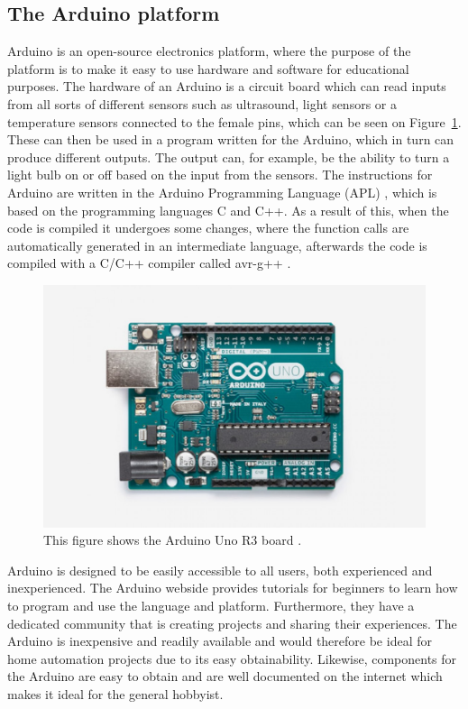 \subsection{The Arduino platform}
Arduino is an open-source electronics platform, where the purpose of the platform is to make it easy to use hardware and software for educational purposes. 
The hardware of an Arduino is a circuit board which can read inputs from all sorts of different sensors such as ultrasound, light sensors or a temperature sensors connected to the female pins, which can be seen on Figure~\ref{fig:ArduinoUnoR3}. 
These can then be used in a program written for the Arduino, which in turn can produce different outputs. The output can, for example, be the ability to turn a light bulb on or off based on the input from the sensors. The instructions for Arduino are written in the Arduino Programming Language (APL) \cite{ArduinoLanguage}, which is based on the programming  languages C and C++. As a result of this, when the code is compiled it undergoes some changes, where the function calls are automatically generated in an intermediate language, afterwards the code is compiled with a C/C++ compiler called avr-g++ \cite{ArduinoLanguage}.
\begin{figure}[H]
\centering
  \includegraphics[width=\textwidth]{figures/Analysis/ArduinoUnoR3.jpg}
  \caption{This figure shows the Arduino Uno R3 board \cite{ArduinoUnoR3}.}
  \label{fig:ArduinoUnoR3}
\end{figure}
\noindent
Arduino is designed to be easily accessible to all users, both experienced and inexperienced. The Arduino webside provides tutorials for beginners to learn how to program and use the language and platform. Furthermore, they have a dedicated community that is creating projects and sharing their experiences. The Arduino is inexpensive and readily available and would therefore be ideal for home automation projects due to its easy obtainability. Likewise, components for the Arduino are easy to obtain and are well documented on the internet which makes it ideal for the general hobbyist.

